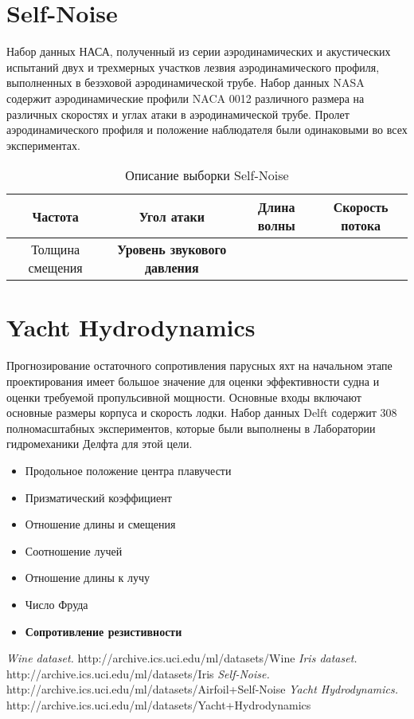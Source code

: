 \documentclass[12pt, twoside]{article}
\begin{document}
\section{Self-Noise\cite{SelfNoise}}
Набор данных НАСА, полученный из серии аэродинамических и акустических испытаний двух и трехмерных участков лезвия аэродинамического профиля, выполненных в безэховой аэродинамической трубе. Набор данных NASA содержит аэродинамические профили NACA 0012 различного размера на различных скоростях и углах атаки в аэродинамической трубе. Пролет аэродинамического профиля и положение наблюдателя были одинаковыми во всех экспериментах.

\begin{table}[h]
\begin{center}
\caption{Описание выборки Self-Noise}
\begin{tabular}{|c|c|c|c|}
\hline
Частота &Угол атаки&Длина волны&Скорость потока\\
\hline
Толщина смещения&\bf Уровень звукового давления&&\\
\hline
\end{tabular}
\end{center}
\end{table}

\section{Yacht Hydrodynamics\cite{Yacht}}
Прогнозирование остаточного сопротивления парусных яхт на начальном этапе проектирования имеет большое значение для оценки эффективности судна и оценки требуемой пропульсивной мощности. Основные входы включают основные размеры корпуса и скорость лодки. Набор данных Delft содержит 308 полномасштабных экспериментов, которые были выполнены в Лаборатории гидромеханики Делфта для этой цели.

\begin{itemize}
\item Продольное положение центра плавучести
\item Призматический коэффициент
\item Отношение длины и смещения
\item Соотношение лучей
\item Отношение длины к лучу
\item Число Фруда
\item {\bf Сопротивление резистивности}
\end{itemize}

\begin{thebibliography}{99}
	\textit{Wine dataset.} http://archive.ics.uci.edu/ml/datasets/Wine
	\textit{Iris dataset.} http://archive.ics.uci.edu/ml/datasets/Iris
	\textit{Self-Noise.} http://archive.ics.uci.edu/ml/datasets/Airfoil+Self-Noise
	\textit{Yacht Hydrodynamics.} http://archive.ics.uci.edu/ml/datasets/Yacht+Hydrodynamics
\end{thebibliography}
\end{document}
